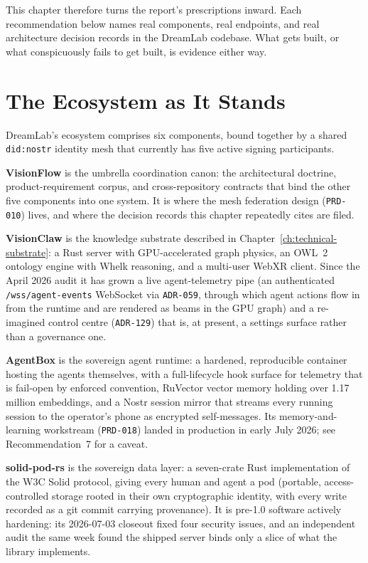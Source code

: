 This chapter therefore turns the report's prescriptions inward. Each recommendation below names real components, real endpoints, and real architecture decision records in the DreamLab codebase. What gets built, or what conspicuously fails to get built, is evidence either way.

\section{The Ecosystem as It Stands}

DreamLab's ecosystem comprises six components, bound together by a shared \texttt{did:nostr} identity mesh that currently has five active signing participants.

\textbf{VisionFlow} is the umbrella coordination canon: the architectural doctrine, product-requirement corpus, and cross-repository contracts that bind the other five components into one system. It is where the mesh federation design (\texttt{PRD-010}) lives, and where the decision records this chapter repeatedly cites are filed.

\textbf{VisionClaw} is the knowledge substrate described in Chapter~\ref{ch:technical-substrate}: a Rust server with GPU-accelerated graph physics, an OWL~2 ontology engine with Whelk reasoning, and a multi-user WebXR client. Since the April 2026 audit it has grown a live agent-telemetry pipe (an authenticated \texttt{/wss/agent-events} WebSocket via \texttt{ADR-059}, through which agent actions flow in from the runtime and are rendered as beams in the GPU graph) and a re-imagined control centre (\texttt{ADR-129}) that is, at present, a settings surface rather than a governance one.

\textbf{AgentBox} is the sovereign agent runtime: a hardened, reproducible container hosting the agents themselves, with a full-lifecycle hook surface for telemetry that is fail-open by enforced convention, RuVector vector memory holding over 1.17 million embeddings, and a Nostr session mirror that streams every running session to the operator's phone as encrypted self-messages. Its memory-and-learning workstream (\texttt{PRD-018}) landed in production in early July 2026; see Recommendation~7 for a caveat.

\textbf{solid-pod-rs} is the sovereign data layer: a seven-crate Rust implementation of the W3C Solid protocol, giving every human and agent a pod (portable, access-controlled storage rooted in their own cryptographic identity, with every write recorded as a git commit carrying provenance). It is pre-1.0 software actively hardening: its 2026-07-03 closeout fixed four security issues, and an independent audit the same week found the shipped server binds only a slice of what the library implements.

